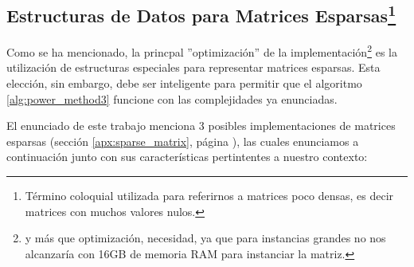 \subsection{Estructuras de Datos para Matrices
Esparsas\protect\footnote{T\'ermino coloquial utilizada para referirnos a
matrices poco densas, es decir matrices con muchos valores nulos.}}
\par Como se ha mencionado, la princpal ''optimizaci\'on'' de la
implementaci\'on\footnote{y m\'as que optimizaci\'on, necesidad, ya que para
instancias grandes no nos alcanzar\'ia con 16GB de memoria RAM para
instanciar la matriz.} es la utilizaci\'on de estructuras especiales para
representar matrices esparsas. Esta elecci\'on, sin embargo, debe ser
inteligente para permitir que el algoritmo \ref{alg:power_method3} funcione con
las complejidades ya enunciadas.

\par El enunciado de este trabajo menciona 3 posibles implementaciones de
matrices esparsas (secci\'on \ref{apx:sparse_matrix}, p\'agina
\pageref{apx:sparse_matrix}), las cuales enunciamos a continuaci\'on junto con
sus caracter\'isticas pertintentes a nuestro contexto:


